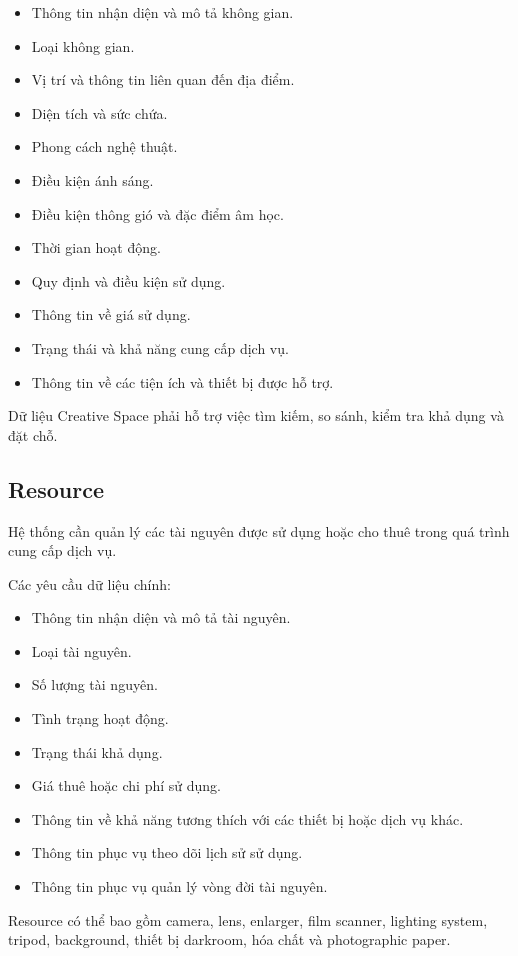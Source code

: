 \begin{itemize}
\item Thông tin nhận diện và mô tả không gian.
\item Loại không gian.
\item Vị trí và thông tin liên quan đến địa điểm.
\item Diện tích và sức chứa.
\item Phong cách nghệ thuật.
\item Điều kiện ánh sáng.
\item Điều kiện thông gió và đặc điểm âm học.
\item Thời gian hoạt động.
\item Quy định và điều kiện sử dụng.
\item Thông tin về giá sử dụng.
\item Trạng thái và khả năng cung cấp dịch vụ.
\item Thông tin về các tiện ích và thiết bị được hỗ trợ.
\end{itemize}

Dữ liệu Creative Space phải hỗ trợ việc tìm kiếm, so sánh, kiểm tra khả dụng và đặt chỗ.

\subsection{Resource}

Hệ thống cần quản lý các tài nguyên được sử dụng hoặc cho thuê trong quá trình cung cấp dịch vụ.

Các yêu cầu dữ liệu chính:

\begin{itemize}
\item Thông tin nhận diện và mô tả tài nguyên.
\item Loại tài nguyên.
\item Số lượng tài nguyên.
\item Tình trạng hoạt động.
\item Trạng thái khả dụng.
\item Giá thuê hoặc chi phí sử dụng.
\item Thông tin về khả năng tương thích với các thiết bị hoặc dịch vụ khác.
\item Thông tin phục vụ theo dõi lịch sử sử dụng.
\item Thông tin phục vụ quản lý vòng đời tài nguyên.
\end{itemize}

Resource có thể bao gồm camera, lens, enlarger, film scanner, lighting system, tripod, background, thiết bị darkroom, hóa chất và photographic paper.

